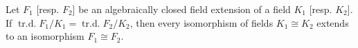 Let $F_1$ [resp. $F_2$] be an algebraically closed field extension of a field $K_1$ [resp. $K_2$].
If $\operatorname{tr.d.} F_1/K_1 = \operatorname{tr.d.} F_2/K_2$, then every isomorphism of fields $K_1 \cong K_2$ extends to an isomorphism $F_1 \cong F_2$.
